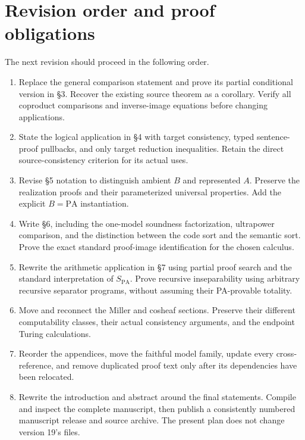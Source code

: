 \documentclass[11pt]{article}
\theoremstyle{definition}\newtheorem{definition}[theorem]{Definition}
\newcommand{\PA}{\mathrm{PA}}
\begin{document}
\section*{Revision order and proof obligations}
The next revision should proceed in the following order.
\begin{enumerate}
\item Replace the general comparison statement and prove its partial
  conditional version in \S3. Recover the existing source theorem
  as a corollary. Verify all coproduct comparisons and inverse-image
  equations before changing applications.
\item State the logical application in \S4 with target consistency,
  typed sentence-proof pullbacks, and only target reduction
  inequalities. Retain the direct source-consistency criterion for
  its actual uses.
\item Revise \S5 notation to distinguish ambient $B$ and represented
  $A$. Preserve the realization proofs and their parameterized
  universal properties. Add the explicit $B=\PA$ instantiation.
\item Write \S6, including the one-model soundness factorization,
  ultrapower comparison, and the distinction between the code sort
  and the semantic sort. Prove the exact standard proof-image
  identification for the chosen calculus.
\item Rewrite the arithmetic application in \S7 using partial
  proof search and the standard interpretation of $S_{\PA}$.
  Prove recursive inseparability using arbitrary recursive
  separator programs, without assuming their PA-provable totality.
\item Move and reconnect the Miller and cosheaf sections. Preserve
  their different computability classes, their actual consistency
  arguments, and the endpoint Turing calculations.
\item Reorder the appendices, move the faithful model family,
  update every cross-reference, and remove duplicated proof text
  only after its dependencies have been relocated.
\item Rewrite the introduction and abstract around the final
  statements. Compile and inspect the complete manuscript, then
  publish a consistently numbered manuscript release and source
  archive. The present plan does not change version 19's files.
\end{enumerate}
\end{document}
